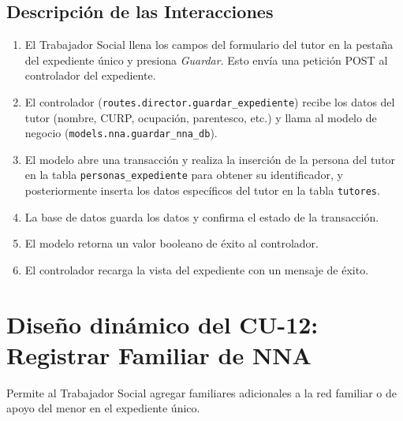 \subsection{Descripción de las Interacciones}
\begin{enumerate}
    \item El Trabajador Social llena los campos del formulario del tutor en la pestaña del expediente único y presiona \textit{Guardar}. Esto envía una petición POST al controlador del expediente.
    \item El controlador (\texttt{routes.director.guardar\_expediente}) recibe los datos del tutor (nombre, CURP, ocupación, parentesco, etc.) y llama al modelo de negocio (\texttt{models.nna.guardar\_nna\_db}).
    \item El modelo abre una transacción y realiza la inserción de la persona del tutor en la tabla \texttt{personas\_expediente} para obtener su identificador, y posteriormente inserta los datos específicos del tutor en la tabla \texttt{tutores}.
    \item La base de datos guarda los datos y confirma el estado de la transacción.
    \item El modelo retorna un valor booleano de éxito al controlador.
    \item El controlador recarga la vista del expediente con un mensaje de éxito.
\end{enumerate}

\section{Diseño dinámico del CU-12: Registrar Familiar de NNA}
\label{sec:disenoDinamicoCU12}

Permite al Trabajador Social agregar familiares adicionales a la red familiar o de apoyo del menor en el expediente único.

